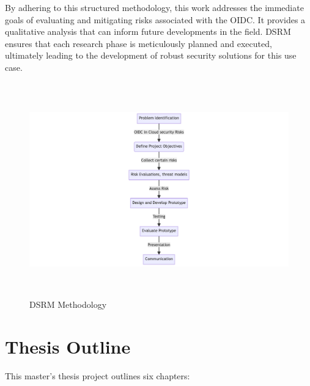 By adhering to this structured methodology, this work addresses the immediate goals of evaluating and mitigating risks associated with the OIDC.
It provides a qualitative analysis that can inform future developments in the field.
DSRM ensures that each research phase is meticulously planned and executed, ultimately leading to the development of robust security solutions for this use case.

\begin{figure}[h!]
\centering

\includegraphics[width=\textwidth, height=350px]{pics/dsrm.png}
\caption{DSRM Methodology}
\label{fig:dsrm}
\end{figure}
\newpage
\section{Thesis Outline}

This master's thesis project outlines six chapters:

